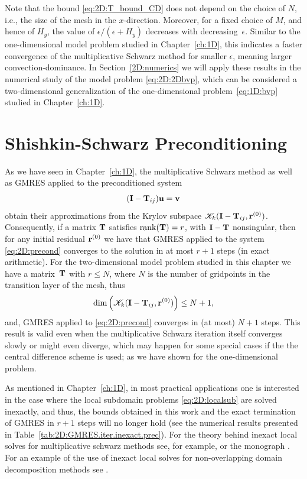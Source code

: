 Note that the bound \eqref{eq:2D:T_bound_CD} does not depend on the
choice of $N$, i.e., the size of the mesh in the $x$-direction. Moreover, for
a fixed choice of $M$, and hence of $H_y$, the value of $\epsilon/(\epsilon+H_y)$
decreases with decreasing~$\epsilon$. Similar to the one-dimensional model
problem studied in Chapter~\ref{ch:1D}, this indicates a faster convergence
of the multiplicative Schwarz method for smaller $\epsilon$, meaning larger
convection-dominance. In Section~\ref{2D:numerics} we will apply these results
in the  numerical study of the model problem \eqref{eq:2D:2Dbvp}, which can be
considered a two-dimensional generalization of the one-dimensional
problem~\eqref{eq:1D:bvp} studied in Chapter~\ref{ch:1D}.

\section{Shishkin-Schwarz Preconditioning}
\label{2D:precon}

As we have seen in Chapter~\ref{ch:1D}, the multiplicative
Schwarz method as well as GMRES applied to the preconditioned system
\begin{equation}\label{eq:2D:precond}
(\mathbf{I}-\mathbf{T}_{ij})\mathbf{u}=\mathbf{v}
\end{equation}
obtain their approximations from the Krylov subspace
$\mathscr{K}_k(\mathbf{I}-\mathbf{T}_{ij},\mathbf{r}^{(0)})$.
Consequently, if a matrix $\mathbf{T}$ satisfies $\mathrm{rank}(\mathbf{T})=r$, with $\mathbf{I}-\mathbf{T}$
nonsingular, then for any initial residual $\mathbf{r}^{(0)}$ we have that GMRES
applied to the system \eqref{eq:2D:precond} converges to the solution in at
most $r+1$ steps (in exact arithmetic). For the two-dimensional model problem
studied in this chapter we have a matrix~$\mathbf{T}$ with $r\leq N$, where $N$ is the
number of gridpoints in the transition layer of the mesh, thus
\begin{equation}\label{eq:2D:K_rank}
\dim \left(\mathscr{K}_k(\mathbf{I}-\mathbf{T}_{ij},\mathbf{r}^{(0)})\right) \leq N+1,
\end{equation}
and, GMRES applied to \eqref{eq:2D:precond} converges in (at most) $N+1$ steps.
This result is valid even when the multiplicative Schwarz iteration itself
converges slowly or might even diverge, which may happen for some special cases
if the the central difference scheme is used; as we have shown for the
one-dimensional problem.

As mentioned in Chapter~\ref{ch:1D}, in most practical applications one is
interested in the case where the local subdomain problems \eqref{eq:2D:localsub}
are solved inexactly, and thus, the bounds obtained in this work and the exact
termination of GMRES in $r+1$ steps will no longer hold (see the numerical
results presented in Table~\ref{tab:2D:GMRES.iter.inexact.prec}). For the
theory behind inexact local solves for multiplicative schwarz methods see, for
example, \cite{BenFroNabSzy01} or the monograph \cite{SmiBjoGro96}. For an
example of the use of inexact local solves for non-overlapping domain
decomposition methods see \cite{BraPasVass98}.

